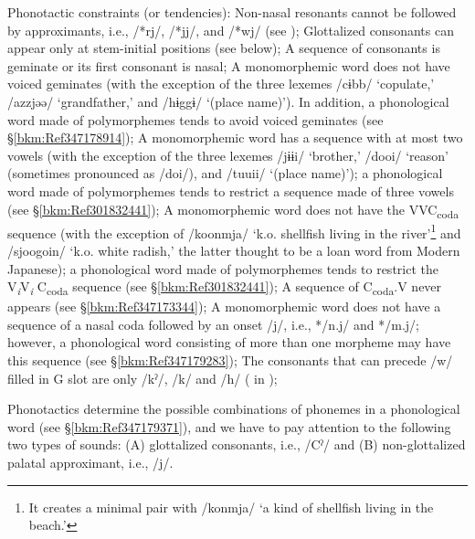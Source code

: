 \ea Phonotactic constraints (or tendencies):
\ea Non-nasal resonants cannot be followed by approximants, i.e., /*rj/, /*jj/, and /*wj/ (see );
\ex Glottalized consonants can appear only at stem-initial positions (see below);
\ex A sequence of consonants is geminate or its first consonant is nasal;
\ex A monomorphemic word does not have voiced geminates (with the exception of the three lexemes /cɨbb/ ‘copulate,’ /azzjəə/ ‘grandfather,’ and /hɨggɨ/ ‘(place name)’). In addition, a phonological word made of polymorphemes tends to avoid voiced geminates (see §\ref{bkm:Ref347178914});
\ex A monomorphemic word has a sequence with at most two vowels (with the exception of the three lexemes /jɨɨi/ ‘brother,’ /dooi/ ‘reason’ (sometimes pronounced as /doi/), and /tuuii/ ‘(place name)’); a phonological word made of polymorphemes tends to restrict a sequence made of three vowels (see §\ref{bkm:Ref301832441});
\ex A monomorphemic word does not have the VVC\textsubscript{coda} sequence (with the exception of /koonmja/ ‘k.o. shellfish living in the river’\footnote{It creates a minimal pair with /konmja/ ‘a kind of shellfish living in the beach.’} and /sjoogoin/ ‘k.o. white radish,’ the latter thought to be a loan word from Modern Japanese); a phonological word made of polymorphemes tends to restrict the V\textit{\textsubscript{i}}V\textit{\textsubscript{i} }C\textsubscript{coda} sequence (see §\ref{bkm:Ref301832441});
\ex A sequence of C\textsubscript{coda}.V never appears (see §\ref{bkm:Ref347173344});
\ex A monomorphemic word does not have a sequence of a nasal coda followed by an onset /j/, i.e., */n.j/ and */m.j/; however, a phonological word consisting of more than one morpheme may have this sequence (see §\ref{bkm:Ref347179283});
\ex The consonants that can precede /w/ filled in G slot are only /kˀ/, /k/ and /h/ ( in );
\z
\z

Phonotactics determine the possible combinations of phonemes in a phonological word (see §\ref{bkm:Ref347179371}), and we have to pay attention to the following two types of sounds: (A) glottalized consonants, i.e., /Cˀ/ and (B) non-glottalized palatal approximant, i.e., /j/.

